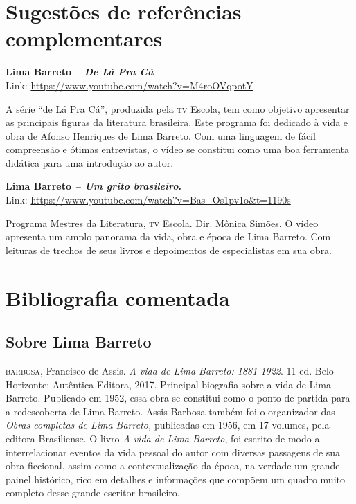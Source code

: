\documentclass{extarticle}
\begin{document}
\section{Sugestões de referências complementares}

\textbf{Lima Barreto -- \emph{De Lá Pra Cá} }\\
Link: \url{https://www.youtube.com/watch?v=M4roOVqpotY}

A série ``de Lá Pra Cá'', produzida pela \textsc{tv} Escola, tem como objetivo
apresentar as principais figuras da literatura brasileira. Este programa
foi dedicado à vida e obra de Afonso Henriques de Lima Barreto. Com uma
linguagem de fácil compreensão e ótimas entrevistas, o vídeo se
constitui como uma boa ferramenta didática para uma introdução ao autor.

\noindent\textbf{Lima Barreto \emph{-- Um grito brasileiro}. }\\
Link: \url{https://www.youtube.com/watch?v=Bas_Os1pv1o\&t=1190s}

Programa Mestres da Literatura, \textsc{tv} Escola. Dir. Mônica Simões. O vídeo
apresenta um amplo panorama da vida, obra e época de Lima Barreto. Com
leituras de trechos de seus livros e depoimentos de especialistas em sua
obra.


\section{Bibliografia comentada}


\subsection{Sobre Lima Barreto}

\textsc{barbosa}, Francisco de Assis. \emph{A vida de Lima Barreto: 1881-1922}.
11 ed. Belo Horizonte: Autêntica Editora, 2017. Principal biografia
sobre a vida de Lima Barreto. Publicado em 1952, essa obra se constitui
como o ponto de partida para a redescoberta de Lima Barreto. Assis
Barbosa também foi o organizador das \emph{Obras completas de Lima
Barreto,} publicadas em 1956, em 17 volumes, pela editora Brasiliense. O
livro \emph{A vida de Lima Barreto}, foi escrito de modo a
interrelacionar eventos da vida pessoal do autor com diversas passagens
de sua obra ficcional, assim como a contextualização da época, na
verdade um grande painel histórico, rico em detalhes e informações que
compõem um quadro muito completo desse grande escritor brasileiro.
\end{document}
